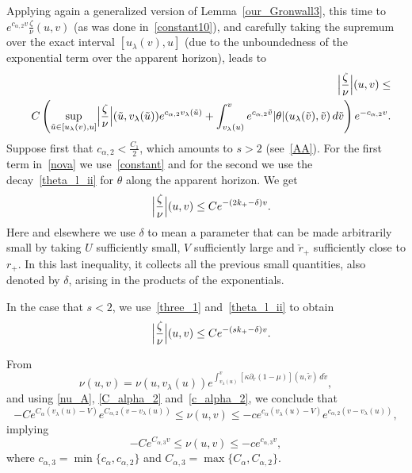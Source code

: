 \documentclass[a4paper,11pt,oneside,reqno]{amsart}
\newcommand{\s}{s}
\newcommand{\kk}{k_+}
\newcommand{\ckrp}{\check r_+}
\begin{document}
Applying again a generalized version of Lemma~\ref{our_Gronwall3}, this time 
to $e^{c_{\alpha,2} v}\frac{\zeta}{\nu}(u,v)$
(as was done in~\eqref{constant10}), and carefully taking
the supremum over the exact interval $[u_\lambda(v),u]$ (due to the unboundedness of the exponential term over the apparent horizon), leads to
\begin{eqnarray}
&&\Bigl|\frac{\zeta}{\nu}\Bigr|(u,v)\leq\label{nova}\\
&& C\left(\sup_{\tilde u\in[u_\lambda(v),u]}\Bigl|\frac\zeta\nu\Bigr|(\tilde u,v_\lambda(\tilde u))
e^{c_{\alpha,2}v_\lambda(\tilde u)}+
\int_{v_\lambda(u)}^v e^{c_{\alpha,2}\tilde v}|\theta|(u_\lambda(\tilde v),\tilde v)\,d\tilde v\right)e^{-c_{\alpha,2} v}.
\nonumber
\end{eqnarray}
Suppose first that $c_{\alpha,2}<\frac{C_1}{2}$, which amounts to
$\s>2$ (see~\eqref{AA}).
For the first term in~\eqref{nova} we use~\eqref{constant}
and for the second we use
the decay~\eqref{theta_l_ii} for $\theta$ along the apparent horizon. We get
\begin{eqnarray}
&&\Bigl|\frac{\zeta}{\nu}\Bigr|(u,v)\label{zn_ii_a}
\leq Ce^{-(2\kk-\delta) v}.
\end{eqnarray}
Here and elsewhere we use $\delta$ to mean a parameter that can be made arbitrarily small by taking $U$ sufficiently small, $V$ sufficiently large and $\ckrp$ sufficiently close to $r_+$. In this last inequality, it collects all the previous small quantities, also denoted by $\delta$, arising in the products of the exponentials.

In the case that $\s<2$, we use~\eqref{three_1} and~\eqref{theta_l_ii} to obtain
\begin{eqnarray}
&&\Bigl|\frac{\zeta}{\nu}\Bigr|(u,v)\label{constant4_new}
\leq Ce^{-(\s\kk-\delta)v}.
\end{eqnarray}


From 
$$
\nu(u,v)=\nu(u,v_\lambda(u))e^{\int_{v_\lambda(u)}^v[\kappa\partial_r(1-\mu)](u,\tilde v)\,d\tilde v},
$$
and using \eqref{nu_A}, \eqref{C_alpha_2} and~\eqref{c_alpha_2},
we conclude that
$$
-Ce^{C_\alpha (v_\lambda(u)-V)}e^{C_{\alpha,2} (v-v_\lambda(u))}\leq\nu(u,v)
\leq-ce^{c_\alpha (v_\lambda(u)-V)}e^{c_{\alpha,2} (v-v_\lambda(u))},
$$
implying
\begin{equation}
\label{nu_2}
-Ce^{C_{\alpha,3} v}\leq\nu(u,v)
\leq-ce^{c_{\alpha,3} v},
\end{equation}
where $c_{\alpha,3}=\min\{c_\alpha,c_{\alpha,2}\}$ and $C_{\alpha,3}=\max\{C_\alpha,C_{\alpha,2}\}$.
\end{document}
